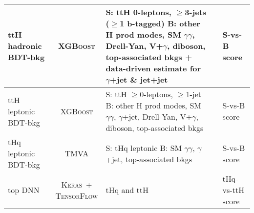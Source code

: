 \begin{tabular}{l|c|m{6cm}<{\centering}|m{12cm}<{\centering}|m{4.5cm}<{\centering}}
    ttH hadronic BDT-bkg &  \textsc{XGBoost} & \makecell*[{{m{6cm}}}]{\centering S: ttH 0-leptons, $\geq$3-jets ($\geq$1 b-tagged) \\ B: other H prod modes, SM $\gamma\gamma$, Drell-Yan, V+$\gamma$, diboson, top-associated bkgs + data-driven estimate for $\gamma$+jet \& jet+jet} &  & S-vs-B score \\ \hline
    
    ttH leptonic BDT-bkg &  \textsc{XGBoost} & \makecell*[{{m{6cm}}}]{\centering S: ttH $\geq$0-leptons, $\geq$1-jet \\ B: other H prod modes, SM $\gamma\gamma$, $\gamma$+jet, Drell-Yan, V+$\gamma$, diboson, top-associated bkgs} &  & S-vs-B score \\ \hline
    
    tHq leptonic BDT-bkg &  \textsc{TMVA} & \makecell*[{{m{6cm}}}]{\centering S: tHq leptonic \\ B: SM $\gamma\gamma$, $\gamma$+jet, top-associated bkgs} &  & S-vs-B score \\ \hline
    
    top DNN &  \makecell{\textsc{Keras}~+\\\textsc{TensorFlow}} & tHq and ttH &  & tHq-vs-ttH score \\
\end{tabular}